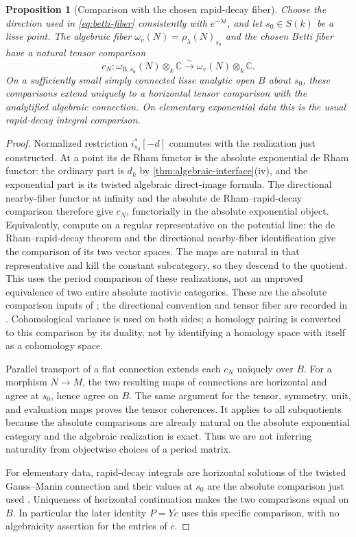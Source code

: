 \documentclass[11pt]{article}
\numberwithin{equation}{section}
\newtheorem{proposition}[proposition]{Proposition}
\theoremstyle{definition}
\theoremstyle{remark}
\newcommand{\C}{\mathbb C}
\newcommand{\B}{\mathrm B}
\begin{document}
\begin{proposition}[Comparison with the chosen rapid-decay fiber]
\label{prop:relative-Betti-interface}
Choose the direction used in \eqref{eq:betti-fiber} consistently with
$e^{-\lambda t}$, and let $s_0\in S(k)$ be a lisse point. The algebraic
fiber $\omega_{v}(N)=\rho_\lambda(N)_{s_0}$ and the chosen Betti fiber
have a natural tensor comparison
\[
 c_N:\omega_{\B,s_0}(N)\otimes_k\C
       \xrightarrow{\sim}\omega_v(N)\otimes_k\C.
\]
On a sufficiently small simply connected lisse analytic open $B$ about
$s_0$, these comparisons extend uniquely to a horizontal tensor
comparison with the analytified algebraic connection. On elementary
exponential data this is the usual rapid-decay integral comparison.
\end{proposition}
\begin{proof}
Normalized restriction $i_{s_0}^*[-d]$ commutes with the realization just
constructed. At a point its de Rham functor is the absolute exponential
de Rham functor: the ordinary part is $d_k$ by
\cref{thm:algebraic-interface}(iv), and the exponential part is its
twisted algebraic direct-image formula. The directional nearby-fiber
functor at infinity and the absolute de Rham--rapid-decay comparison
therefore give $c_N$, functorially in the absolute exponential object.
Equivalently, compute on a regular representative on the potential line:
the de Rham--rapid-decay theorem and the directional nearby-fiber
identification give the comparison of its two vector spaces. The maps
are natural in that representative and kill the constant subcategory, so
they descend to the quotient. This uses the period comparison of these
realizations, not an unproved equivalence of two entire absolute motivic
categories.
These are the absolute comparison inputs of
\cite{FresanJossen,Hien}; the directional convention and tensor fiber
are recorded in \cite[Definition~3.5 and Theorem~3.6]{Snodgrass}.
Cohomological variance is used on both sides; a homology pairing is
converted to this comparison by its duality, not by identifying a homology
space with itself as a cohomology space.

Parallel transport of a flat connection extends each $c_N$ uniquely over
$B$. For a morphism $N\to M$, the two resulting maps of connections are
horizontal and agree at $s_0$, hence agree on $B$. The same argument for
the tensor, symmetry, unit, and evaluation maps proves the tensor
coherences. It applies to all subquotients because the absolute comparisons
are already natural on the absolute exponential category and the
algebraic realization is exact. Thus we are not inferring naturality from
objectwise choices of a period matrix.

For elementary data, rapid-decay integrals are horizontal solutions of
the twisted Gauss--Manin connection and their values at $s_0$ are the
absolute comparison just used \cite{HienRoucairol,Hien}. Uniqueness of
horizontal continuation makes the two comparisons equal on $B$. In
particular the later identity $P=Yc$ uses this specific comparison, with
no algebraicity assertion for the entries of $c$.
\end{proof}
\end{document}
